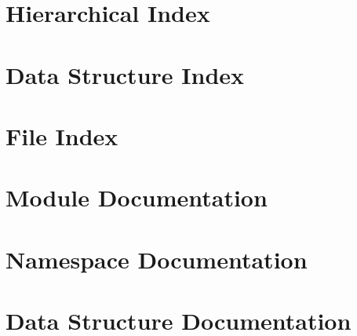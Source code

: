 \let\mypdfximage\pdfximage\def\pdfximage{\immediate\mypdfximage}\documentclass[twoside]{book}
\newcommand{\+}{\discretionary{\mbox{\scriptsize$\hookleftarrow$}}{}{}}
\begin{document}
\chapter{Hierarchical Index}

\chapter{Data Structure Index}

\chapter{File Index}

\chapter{Module Documentation}























\chapter{Namespace Documentation}

\chapter{Data Structure Documentation}


















\end{document}
